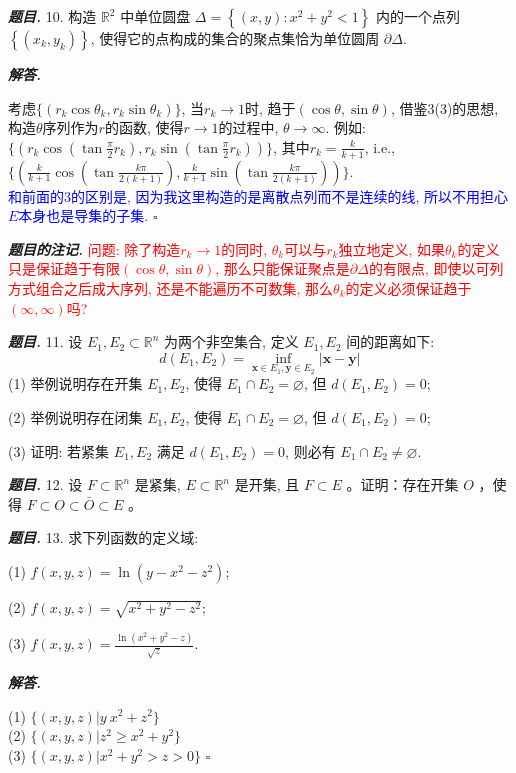 \documentclass[10pt, a4paper, oneside]{ctexart}
\newenvironment{problem}{\begin{framed}\par\noindent\textbf{\textit{题目. }}}{\end{framed}\par}
\newenvironment{solution}{%
  \par\noindent\textbf{\textit{解答. }}\ignorespaces
}{%
  \hfill\ensuremath{\square}\par %
}
\newenvironment{note}{\par\noindent\textbf{\textit{题目的注记. }}\ignorespaces}{\par}
\begin{document}
\begin{problem}
10. 构造 $\mathbb{R}^2$ 中单位圆盘 $\Delta=\left\{(x, y): x^2+y^2<1\right\}$ 内的一个点列 $\left\{\left(x_k, y_k\right)\right\}$, 使得它的点构成的集合的聚点集恰为单位圆周 $\partial \Delta$.
\end{problem}

\begin{solution}
考虑$\{(r_k\cos \theta_k, r_k \sin \theta_k)\}$, 当$r_k\to 1$时, 趋于$(\cos\theta, \sin\theta)$, 借鉴3(3)的思想, 构造$\theta$序列作为$r$的函数, 使得$r\to 1$的过程中, $\theta\to \infty$. 例如: $\{(r_k\cos(\tan \frac{\pi}{2}r_k),r_k\sin(\tan \frac{\pi}{2}r_k))\}$, 其中$r_k=\frac{k}{k+1}$, i.e., $\{(\frac{k}{k+1}\cos(\tan \frac{k\pi}{2(k+1)}),\frac{k}{k+1}\sin(\tan \frac{k\pi}{2(k+1)}))\}$.\\
\textcolor{blue}{和前面的3的区别是, 因为我这里构造的是离散点列而不是连续的线, 所以不用担心$E$本身也是导集的子集.}
\end{solution}
\begin{note}
    \textcolor{red}{问题: 除了构造$r_k\to 1$的同时, $\theta_k$可以与$r_k$独立地定义, 如果$\theta_k$的定义只是保证趋于有限$(\cos \theta, \sin \theta)$, 那么只能保证聚点是$\partial \Delta$的有限点, 即使以可列方式组合之后成大序列, 还是不能遍历不可数集, 那么$\theta_k$的定义必须保证趋于$(\infty, \infty)$吗?}
\end{note}

\begin{problem}
11. 设 $E_1, E_2 \subset \mathbb{R}^n$ 为两个非空集合, 定义 $E_1, E_2$ 间的距离如下:
$$
d\left(E_1, E_2\right)=\inf _{\boldsymbol{x} \in E_1, \boldsymbol{y} \in E_2}|\boldsymbol{x}-\boldsymbol{y}|
$$
(1) 举例说明存在开集 $E_1, E_2$, 使得 $E_1 \cap E_2=\varnothing$, 但 $d\left(E_1, E_2\right)=0$;

(2) 举例说明存在闭集 $E_1, E_2$, 使得 $E_1 \cap E_2=\varnothing$, 但 $d\left(E_1, E_2\right)=0$;

(3) 证明: 若紧集 $E_1, E_2$ 满足 $d\left(E_1, E_2\right)=0$, 则必有 $E_1 \cap E_2 \neq \varnothing$.
\end{problem}

\begin{problem}
12. 设 $F \subset \mathbb{R}^n$ 是紧集, $E \subset \mathbb{R}^n$ 是开集, 且 $F \subset E$ 。证明：存在开集 $O$ ，使得 $F \subset O \subset \bar{O} \subset E$ 。
\end{problem}

\begin{problem}
13. 求下列函数的定义域:

(1) $f(x, y, z)=\ln \left(y-x^2-z^2\right)$;

(2) $f(x, y, z)=\sqrt{x^2+y^2-z^2}$;

(3) $f(x, y, z)=\frac{\ln \left(x^2+y^2-z\right)}{\sqrt{z}}$.
\end{problem}
\begin{solution}
(1) $\{(x,y,z)| y\> x^2+z^2\}$\\
(2) $\{(x,y,z)| z^2\geq x^2+y^2\}$\\
(3) $\{(x,y,z)| x^2+y^2>z>0\}$
\end{solution}
\end{document}
